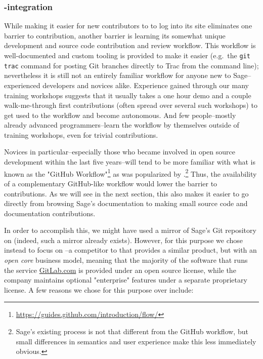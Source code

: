 \hypertarget{gitlab-trac-integration}{%
\subsubsection{\GitLab-\Trac integration}\label{gitlab-trac-integration}}

While making it easier for new contributors to \Sage to log into its \Trac site
eliminates one barrier to contribution, another barrier is learning its
somewhat unique development and source code contribution and review workflow.
This workflow is well-documented and custom tooling is provided to make it
easier (e.g.~the {\tt git trac} command for posting Git branches directly to
Trac from the command line); nevertheless it is still not an entirely familiar
workflow for anyone new to Sage--experienced developers and novices alike.
%
Experience gained through our many training workshops suggests that it usually
takes a one hour demo and a couple walk-me-through first contributions (often
spread over several such workshops) to get used to the workflow and become
autonomous. And few people--mostly already advanced programmers--learn the
workflow by themselves outside of training workshops, even for trivial
contributions.

Novices in particular--especially those who became involved in open source
development within the last five years--will tend to be more familiar with what
is known as the "GitHub
Workflow"\footnote{\url{https://guides.github.com/introduction/flow/}} as was
popularized by \GitHub.\footnote{Sage's existing process is not that different
from the GitHub workflow, but small differences in semantics and user
experience make this less immediately obvious.} Thus, the availability of a
complementary GitHub-like workflow would lower the barrier to contributions.
As we will see in the next section, this also makes it easier to go directly
from browsing Sage's documentation to making small source code and
documentation contributions.

In order to accomplish this, we might have used a mirror of Sage's Git
repository on \GitHub (indeed, such a mirror already exists).  However, for
this purpose we chose instead to focus on \GitLab--a competitor to \GitHub that
provides a similar product, but with an {\em open core} business model, meaning
that the majority of the software that runs the service \url{GitLab.com} is
provided under an open source license, while the company maintains optional
"enterprise" features under a separate proprietary license.  A few reasons we
chose \GitLab for this purpose over \GitHub include:

